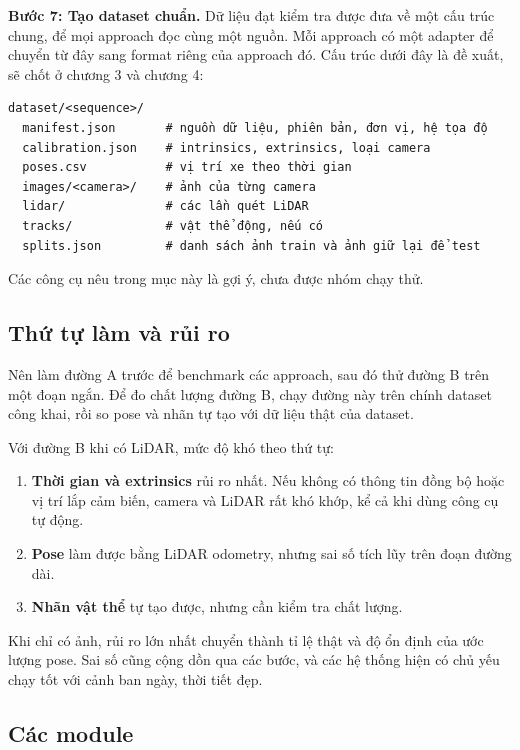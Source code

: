 \textbf{Bước 7: Tạo dataset chuẩn.}
Dữ liệu đạt kiểm tra được đưa về một cấu trúc chung, để mọi approach đọc cùng một nguồn. Mỗi approach có một adapter để chuyển từ đây sang format riêng của approach đó.
Cấu trúc dưới đây là đề xuất, sẽ chốt ở chương 3 và chương 4:

\begin{lstlisting}[numbers=none, morecomment={[l]\#}, texcl=true, caption={Cấu trúc dataset chuẩn (đề xuất)}, breaklines=false]
dataset/<sequence>/
  manifest.json       # nguồn dữ liệu, phiên bản, đơn vị, hệ tọa độ
  calibration.json    # intrinsics, extrinsics, loại camera
  poses.csv           # vị trí xe theo thời gian
  images/<camera>/    # ảnh của từng camera
  lidar/              # các lần quét LiDAR
  tracks/             # vật thể động, nếu có
  splits.json         # danh sách ảnh train và ảnh giữ lại để test
\end{lstlisting}

Các công cụ nêu trong mục này là gợi ý, chưa được nhóm chạy thử.

\subsection{Thứ tự làm và rủi ro}

Nên làm đường A trước để benchmark các approach, sau đó thử đường B trên một đoạn ngắn.
Để đo chất lượng đường B, chạy đường này trên chính dataset công khai, rồi so pose và nhãn tự tạo với dữ liệu thật của dataset.

Với đường B khi có LiDAR, mức độ khó theo thứ tự:
\begin{enumerate}
  \item \textbf{Thời gian và extrinsics} rủi ro nhất. Nếu không có thông tin đồng bộ hoặc vị trí lắp cảm biến, camera và LiDAR rất khó khớp, kể cả khi dùng công cụ tự động.
  \item \textbf{Pose} làm được bằng LiDAR odometry, nhưng sai số tích lũy trên đoạn đường dài.
  \item \textbf{Nhãn vật thể} tự tạo được, nhưng cần kiểm tra chất lượng.
\end{enumerate}

Khi chỉ có ảnh, rủi ro lớn nhất chuyển thành tỉ lệ thật và độ ổn định của ước lượng pose. Sai số cũng cộng dồn qua các bước, và các hệ thống hiện có chủ yếu chạy tốt với cảnh ban ngày, thời tiết đẹp.

\subsection{Các module}

